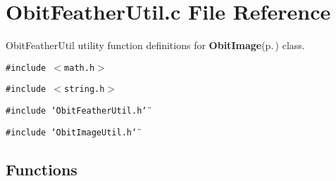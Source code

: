 \section{Obit\-Feather\-Util.c File Reference}
\label{ObitFeatherUtil_8c}
Obit\-Feather\-Util utility function definitions for {\bf Obit\-Image}{\rm (p.\,\pageref{structObitImage})} class. 

{\tt \#include $<$math.h$>$}\par
{\tt \#include $<$string.h$>$}\par
{\tt \#include \char`\"{}Obit\-Feather\-Util.h\char`\"{}}\par
{\tt \#include \char`\"{}Obit\-Image\-Util.h\char`\"{}}\par
\subsection*{Functions}
